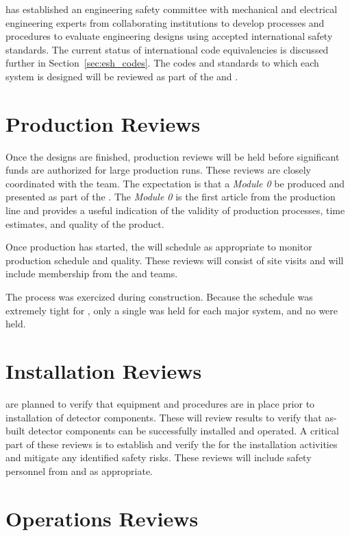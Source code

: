  has established an engineering safety committee with
mechanical and electrical engineering experts from collaborating
institutions to develop processes and procedures to evaluate
engineering designs using accepted international safety standards. The
current status of international code equivalencies is discussed
further in Section~\ref{sec:esh_codes}. The codes and standards to
which each system is designed will be reviewed as part of the
 and .

\section{Production Reviews}

Once the designs are finished, production reviews will be held before
significant funds are authorized for large production runs. These
reviews are closely coordinated with the  team. The
expectation is that a \textit{Module 0} be produced and presented as
part of the . The \textit{Module 0} is the first article
from the production line and provides a useful indication of the
validity of production processes, time estimates, and quality of the
product.

Once production has started, the   will schedule  as
appropriate to monitor production schedule and quality. These reviews
will consist of site visits and will include membership from the
 and  teams.

The  process was exercized during 
construction. Because the schedule was extremely tight for
, only a single  was held for each major
system, and no  were held.


\section{Installation Reviews}

 are planned to verify that equipment and procedures are in
place prior to installation of detector components. These will
review  results to verify that as-built detector
components can be successfully installed and operated. A critical part
of these reviews is to establish and verify the  for the
installation activities and mitigate any identified safety risks.  These reviews
will include safety personnel from  and  as
appropriate.


\section{Operations Reviews}



